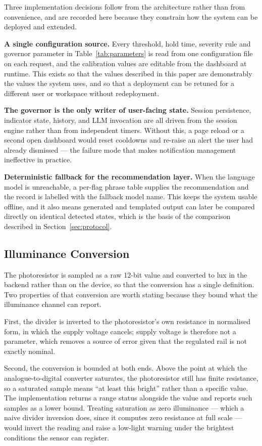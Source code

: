 Three implementation decisions follow from the architecture rather than from convenience, and are
recorded here because they constrain how the system can be deployed and extended.

\textbf{A single configuration source.} Every threshold, hold time, severity rule and governor
parameter in Table~\ref{tab:parameters} is read from one configuration file on each request, and
the calibration values are editable from the dashboard at runtime. This exists so that the values
described in this paper are demonstrably the values the system uses, and so that a deployment can
be retuned for a different user or workspace without redeployment.

\textbf{The governor is the only writer of user-facing state.} Session persistence, indicator
state, history, and LLM invocation are all driven from the session engine rather than from
independent timers. Without this, a page reload or a second open dashboard would reset cooldowns
and re-raise an alert the user had already dismissed --- the failure mode that makes notification
management ineffective in practice.

\textbf{Deterministic fallback for the recommendation layer.} When the language model is
unreachable, a per-flag phrase table supplies the recommendation and the record is labelled with
the fallback model name. This keeps the system usable offline, and it also means generated and
templated output can later be compared directly on identical detected states, which is the basis
of the comparison described in Section~\ref{sec:protocol}.

\subsection{Illuminance Conversion}

The photoresistor is sampled as a raw 12-bit value and converted to lux in the backend rather than
on the device, so that the conversion has a single definition. Two properties of that conversion
are worth stating because they bound what the illuminance channel can report.

First, the divider is inverted to the photoresistor's own resistance in normalised form, in which
the supply voltage cancels; supply voltage is therefore not a parameter, which removes a source of
error given that the regulated rail is not exactly nominal.

Second, the conversion is bounded at both ends. Above the point at which the analogue-to-digital
converter saturates, the photoresistor still has finite resistance, so a saturated sample means
``at least this bright'' rather than a specific value. The implementation returns a range status
alongside the value and reports such samples as a lower bound. Treating saturation as zero
illuminance --- which a naive divider inversion does, since it computes zero resistance at full
scale --- would invert the reading and raise a low-light warning under the brightest conditions the
sensor can register.

